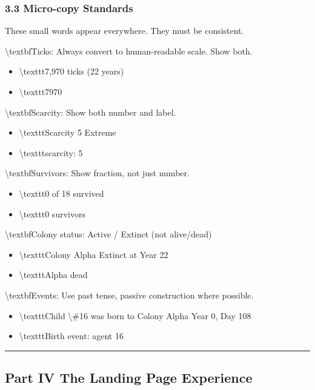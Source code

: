 \documentclass[11pt,a4paper]{article}
\begin{document}
\subsubsection*{3.3 Micro-copy Standards}

These small words appear everywhere. They must be consistent.

\textbackslash{}textbf{Ticks:} Always convert to human-readable scale. Show both.
\begin{itemize}
  \item  \textbackslash{}texttt{7,970 ticks (22 years)}
  \item  \textbackslash{}texttt{7970}
\end{itemize}

\textbackslash{}textbf{Scarcity:} Show both number and label.
\begin{itemize}
  \item  \textbackslash{}texttt{Scarcity 5  Extreme}
  \item  \textbackslash{}texttt{scarcity: 5}
\end{itemize}

\textbackslash{}textbf{Survivors:} Show fraction, not just number.
\begin{itemize}
  \item  \textbackslash{}texttt{0 of 18 survived}
  \item  \textbackslash{}texttt{0 survivors}
\end{itemize}

\textbackslash{}textbf{Colony status:} Active / Extinct (not alive/dead)
\begin{itemize}
  \item  \textbackslash{}texttt{Colony Alpha  Extinct at Year 22}
  \item  \textbackslash{}texttt{Alpha dead}
\end{itemize}

\textbackslash{}textbf{Events:} Use past tense, passive construction where possible.
\begin{itemize}
  \item  \textbackslash{}texttt{Child \textbackslash{}\#16 was born to Colony Alpha  Year 0, Day 108}
  \item  \textbackslash{}texttt{Birth event: agent 16}
\end{itemize}

\noindent\rule{\textwidth}{0.4pt}

\subsection*{Part IV  The Landing Page Experience}
\end{document}
